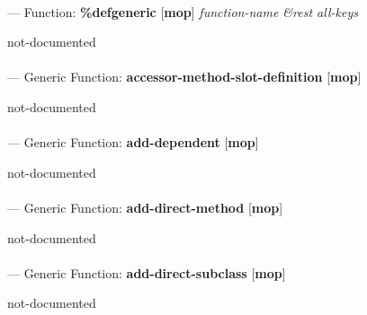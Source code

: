 \paragraph{}
\label{MOP:DEFGENERIC}
--- Function: \textbf{\%defgeneric} [\textbf{mop}] \textit{function-name \&rest all-keys}

\begin{adjustwidth}{5em}{5em}
not-documented
\end{adjustwidth}

\paragraph{}
\label{MOP:ACCESSOR-METHOD-SLOT-DEFINITION}
--- Generic Function: \textbf{accessor-method-slot-definition} [\textbf{mop}] \textit{}

\begin{adjustwidth}{5em}{5em}
not-documented
\end{adjustwidth}

\paragraph{}
\label{MOP:ADD-DEPENDENT}
--- Generic Function: \textbf{add-dependent} [\textbf{mop}] \textit{}

\begin{adjustwidth}{5em}{5em}
not-documented
\end{adjustwidth}

\paragraph{}
\label{MOP:ADD-DIRECT-METHOD}
--- Generic Function: \textbf{add-direct-method} [\textbf{mop}] \textit{}

\begin{adjustwidth}{5em}{5em}
not-documented
\end{adjustwidth}

\paragraph{}
\label{MOP:ADD-DIRECT-SUBCLASS}
--- Generic Function: \textbf{add-direct-subclass} [\textbf{mop}] \textit{}

\begin{adjustwidth}{5em}{5em}
not-documented
\end{adjustwidth}

